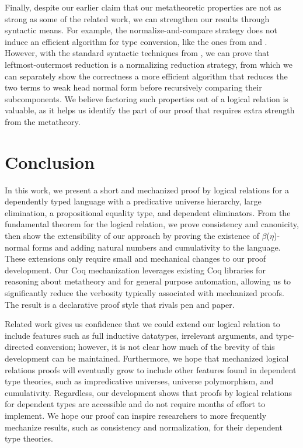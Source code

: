 \documentclass[\ifpublic nolinenum\else\fi,online,OA]{jfp}
\newcommand{\scw}[1]{}
\newcommand{\yl}[1]{}
\theoremstyle{definition}
\begin{document}
\ifextended
Finally, despite our earlier claim that our metatheoretic properties
are not as strong as some of the related work, we can strengthen our
results through syntactic means. For example, the
normalize-and-compare strategy does not induce an efficient algorithm
for type conversion, like the ones from \citet{decagda} and
\citet{martin-lof-a-la-coq}. However, with the standard syntactic
techniques from \citet{takahashi-parallel-reduction,
factorization-essentially}, we can prove that leftmost-outermost
reduction is a normalizing reduction strategy, from which we can
separately show the correctness a more efficient algorithm that
reduces the two terms to weak head normal form before recursively
comparing their subcomponents. We believe factoring such properties
out of a logical relation is valuable, as it helps us identify the
part of our proof that requires extra strength from the metatheory.
\scw{Why don't we just use leftmost-outermost reduction in the first place?
Do we even need nondeterministic parallel reduction?}
\yl{The conversion uses full reduction. Nondeterministic reduction
  makes it harder to show that convertible types have the same
  meaning. Maybe it would require us to prove factorization in our
  development but it definitely simplifies the determinism proof
  (confluence is no longer required before the fundamental
  lemma). }
\fi

\section{Conclusion}
\label{sec:conclusion}
In this work, we present a short and mechanized proof by logical relations for
a dependently typed language with a predicative universe hierarchy, large
elimination, a propositional equality type, and dependent eliminators.
From the fundamental theorem for the logical relation, we prove consistency
and canonicity, then show the extensibility of our approach by proving the
existence of $\beta$($\eta$)-normal forms and adding natural numbers and
cumulativity to the language. These extensions only require small and mechanical
changes to our proof development. Our Coq mechanization leverages existing Coq
libraries for reasoning about metatheory and for general purpose automation,
allowing us to significantly reduce the verbosity typically associated with
mechanized proofs. The result is a declarative proof style that rivals pen and paper.

Related work gives us confidence that we could extend our logical relation to
include features such as full inductive datatypes, irrelevant arguments, and
type-directed conversion; however, it is not clear how much of the brevity of
this development can be maintained. Furthermore, we hope that mechanized
logical relations proofs will eventually grow to include other features found
in dependent type theories, such as impredicative universes, universe
polymorphism, and cumulativity. Regardless, our development shows that proofs
by logical relations for dependent types are accessible and do not require
months of effort to implement. We hope our proof can inspire researchers to
more frequently mechanize results, such as consistency and normalization, for
their dependent type theories.




\label{lastpage}
\end{document}
